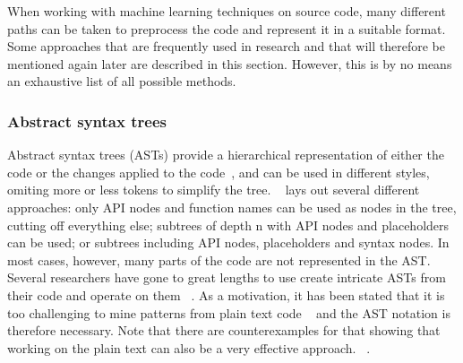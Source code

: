 \documentclass[
	a4paper,
	pagesize,
	pdftex,
	12pt,
	twoside, %
	BCOR=5mm, %
	ngerman,
	fleqn,
	final,
	]{scrartcl}
\begin{document}
When working with machine learning techniques on source code, many different paths can be taken to preprocess the code and represent it in a suitable format. Some approaches that are frequently used in research and that will therefore be mentioned again later are described in this section. However, this is by no means an exhaustive list of all possible methods. 

\subsubsection{Abstract syntax trees}
Abstract syntax trees (ASTs) provide a hierarchical representation of either the code or the changes applied to the code~\cite{Liu.2018}, and can be used in different styles, omiting more or less tokens to simplify the tree. ~\cite{Yamaguchi.2012} lays out several different approaches: only API nodes and function names can be used as nodes in the tree, cutting off everything else; subtrees of depth n with API nodes and placeholders can be used; or subtrees including API nodes, placeholders and syntax nodes. In most cases, however, many parts of the code are not represented in the AST.\\ Several researchers have gone to great lengths to use create intricate ASTs from their code and operate on them ~\cite{Ma.2017,Yamaguchi.2012}. As a motivation, it has been stated that it is too challenging to mine patterns from plain text code ~\cite{Liu.2018} and the AST notation is therefore necessary. Note that there are counterexamples for that showing that working on the plain text can also be a very effective approach. ~\cite{Russell.2018,Hovsepyan.2012}.\\
\end{document}
